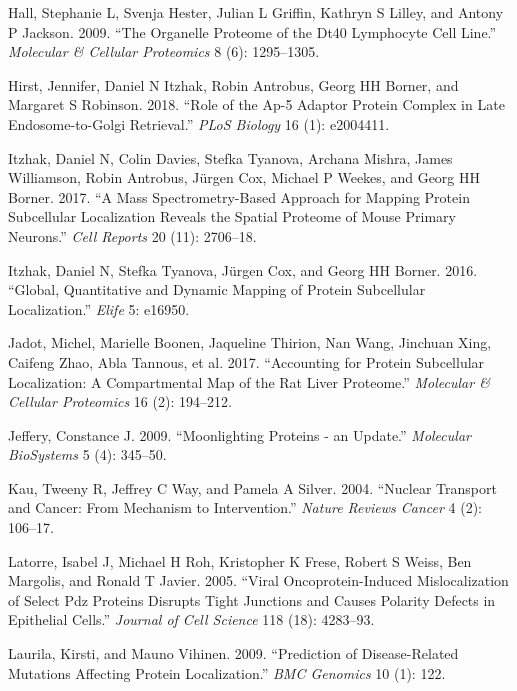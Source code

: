 \documentclass[
]{article}
\begin{document}
\leavevmode\hypertarget{ref-Hall:2009}{}%
Hall, Stephanie L, Svenja Hester, Julian L Griffin, Kathryn S Lilley,
and Antony P Jackson. 2009. ``The Organelle Proteome of the Dt40
Lymphocyte Cell Line.'' \emph{Molecular \& Cellular Proteomics} 8 (6):
1295--1305.

\leavevmode\hypertarget{ref-Hirst:2018}{}%
Hirst, Jennifer, Daniel N Itzhak, Robin Antrobus, Georg HH Borner, and
Margaret S Robinson. 2018. ``Role of the Ap-5 Adaptor Protein Complex in
Late Endosome-to-Golgi Retrieval.'' \emph{PLoS Biology} 16 (1):
e2004411.

\leavevmode\hypertarget{ref-Itzhak:2017}{}%
Itzhak, Daniel N, Colin Davies, Stefka Tyanova, Archana Mishra, James
Williamson, Robin Antrobus, Jürgen Cox, Michael P Weekes, and Georg HH
Borner. 2017. ``A Mass Spectrometry-Based Approach for Mapping Protein
Subcellular Localization Reveals the Spatial Proteome of Mouse Primary
Neurons.'' \emph{Cell Reports} 20 (11): 2706--18.

\leavevmode\hypertarget{ref-Itzhak:2016}{}%
Itzhak, Daniel N, Stefka Tyanova, Jürgen Cox, and Georg HH Borner. 2016.
``Global, Quantitative and Dynamic Mapping of Protein Subcellular
Localization.'' \emph{Elife} 5: e16950.

\leavevmode\hypertarget{ref-Jadot:2017}{}%
Jadot, Michel, Marielle Boonen, Jaqueline Thirion, Nan Wang, Jinchuan
Xing, Caifeng Zhao, Abla Tannous, et al. 2017. ``Accounting for Protein
Subcellular Localization: A Compartmental Map of the Rat Liver
Proteome.'' \emph{Molecular \& Cellular Proteomics} 16 (2): 194--212.

\leavevmode\hypertarget{ref-Jeffery:2009}{}%
Jeffery, Constance J. 2009. ``Moonlighting Proteins - an Update.''
\emph{Molecular BioSystems} 5 (4): 345--50.

\leavevmode\hypertarget{ref-Kau:2004}{}%
Kau, Tweeny R, Jeffrey C Way, and Pamela A Silver. 2004. ``Nuclear
Transport and Cancer: From Mechanism to Intervention.'' \emph{Nature
Reviews Cancer} 4 (2): 106--17.

\leavevmode\hypertarget{ref-Latorre:2005}{}%
Latorre, Isabel J, Michael H Roh, Kristopher K Frese, Robert S Weiss,
Ben Margolis, and Ronald T Javier. 2005. ``Viral Oncoprotein-Induced
Mislocalization of Select Pdz Proteins Disrupts Tight Junctions and
Causes Polarity Defects in Epithelial Cells.'' \emph{Journal of Cell
Science} 118 (18): 4283--93.

\leavevmode\hypertarget{ref-Laurila:2009}{}%
Laurila, Kirsti, and Mauno Vihinen. 2009. ``Prediction of
Disease-Related Mutations Affecting Protein Localization.'' \emph{BMC
Genomics} 10 (1): 122.
\end{document}
